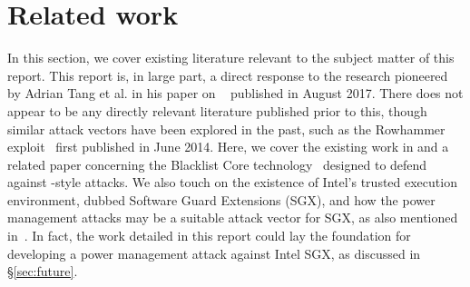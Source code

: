 \chapter{Related work}

In this section, we cover existing literature relevant to the subject matter of
this report. This report is, in large part, a direct response to the research
pioneered by Adrian Tang et al. in his paper on
\clkscrew{}~\cite{clkscrew} published in August 2017. There does not appear to
be any directly relevant literature published prior to this, though similar
attack vectors have been explored in the past, such as
the Rowhammer exploit~\cite{rowhammer} first published in June 2014. Here, we
cover the existing work in \cite{clkscrew} and a related paper
concerning the Blacklist Core technology~\cite{blacklistCore} designed to
defend against \clkscrew{}-style attacks. We also touch on the existence of
Intel's trusted execution environment, dubbed Software Guard Extensions (SGX),
and how the power management attacks may be a suitable attack vector for SGX, as also
mentioned in~\cite{securityOfSGX}. In fact, the work detailed in this report
could lay the foundation for developing a power management attack against
Intel SGX, as discussed in §\ref{sec:future}.






